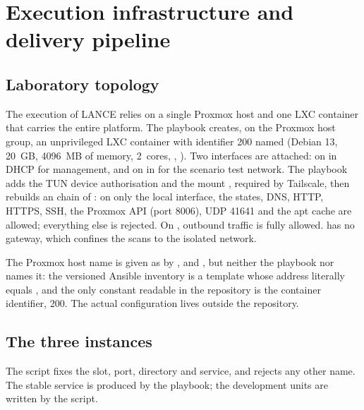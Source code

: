 \section{Execution infrastructure and delivery pipeline}
\label{sec:infrastructure}

\subsection{Laboratory topology}

The execution of LANCE relies on a single Proxmox host and one LXC container that
carries the entire platform. The playbook
 creates, on the Proxmox host
group, an unprivileged LXC container with identifier 200 named 
(Debian 13, 20~GB, 4096~MB of memory, 2~cores, , ).
Two interfaces are attached:  on  in DHCP for management,
and  on  in  for the scenario test
network. The playbook adds the TUN device authorisation and the mount
, required by Tailscale, then rebuilds an  chain
of : on  only the local interface, the
 states, DNS, HTTP, HTTPS, SSH, the Proxmox API (port
8006), UDP 41641 and the apt cache are allowed; everything else is rejected. On
, outbound traffic is fully allowed.  has no gateway, which
confines the scans to the isolated network.

The Proxmox host name is given as  by ,
 and , but neither
the playbook nor  names it: the
versioned Ansible inventory is a template whose address literally equals
, and the only constant readable in the repository is the
container identifier, 200. The actual configuration lives outside the repository.

\subsection{The three instances}

The script  fixes the slot, port,
directory and service, and rejects any other name. The stable service is produced
by the playbook; the development units are written by the script.

